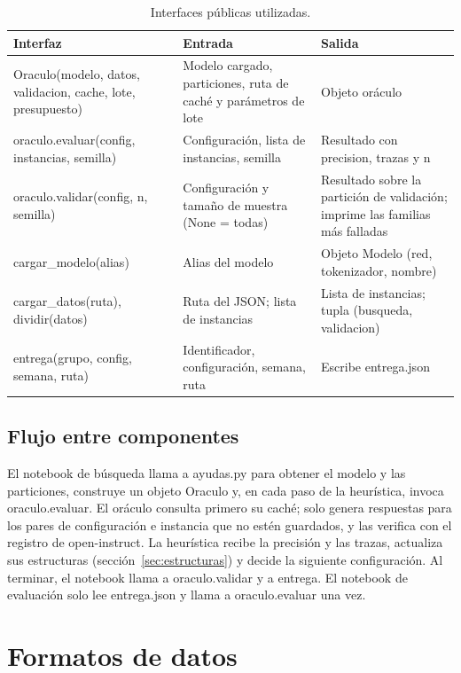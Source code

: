 \documentclass[12pt,letterpaper]{article}
\theoremstyle{definition}
\begin{document}
\begin{table}[H]
\caption{Interfaces públicas utilizadas.}\label{tab:interfaces}
\begin{tabularx}{\textwidth}{@{}p{5.6cm}LL@{}}
\toprule
Interfaz & Entrada & Salida \\
\midrule
Oraculo(modelo, datos, validacion, cache, lote, presupuesto) & Modelo cargado, particiones, ruta de caché y parámetros de lote & Objeto oráculo \\
oraculo.evaluar(config, instancias, semilla) & Configuración, lista de instancias, semilla & Resultado con precision, trazas y n \\
oraculo.validar(config, n, semilla) & Configuración y tamaño de muestra (None = todas) & Resultado sobre la partición de validación; imprime las familias más falladas \\
cargar\_modelo(alias) & Alias del modelo & Objeto Modelo (red, tokenizador, nombre) \\
cargar\_datos(ruta), dividir(datos) & Ruta del JSON; lista de instancias & Lista de instancias; tupla (busqueda, validacion) \\
entrega(grupo, config, semana, ruta) & Identificador, configuración, semana, ruta & Escribe entrega.json \\
\bottomrule
\end{tabularx}
\end{table}

\subsection{Flujo entre componentes}
El notebook de búsqueda llama a ayudas.py para obtener el modelo y las particiones, construye un objeto Oraculo y, en cada paso de la heurística, invoca oraculo.evaluar. El oráculo consulta primero su caché; solo genera respuestas para los pares de configuración e instancia que no estén guardados, y las verifica con el registro de open-instruct. La heurística recibe la precisión y las trazas, actualiza sus estructuras (sección~\ref{sec:estructuras}) y decide la siguiente configuración. Al terminar, el notebook llama a oraculo.validar y a entrega. El notebook de evaluación solo lee entrega.json y llama a oraculo.evaluar una vez.

\section{Formatos de datos}
\end{document}
